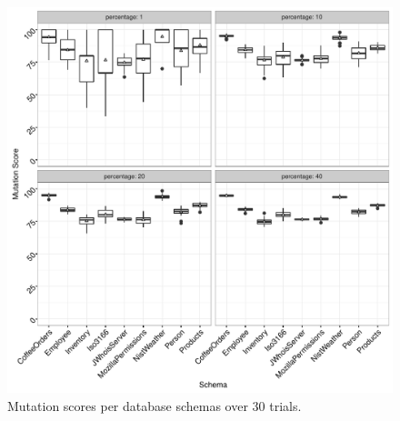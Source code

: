 \begin{figure}[!t]
  \centering
    \hspace*{-1em}\includegraphics[scale = 0.5]{graphs/schema_vs_ms.pdf}
  \caption{\label{fig:graph}Mutation scores per database schemas over 30 trials.}


\vspace{-1.8em}
\end{figure}
